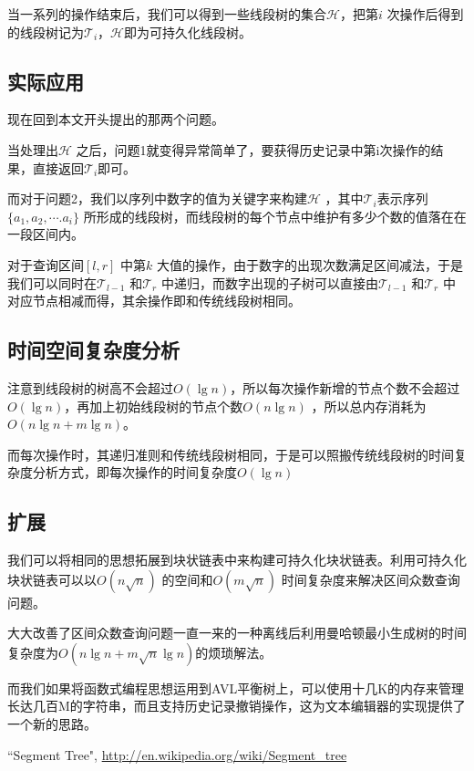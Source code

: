 \documentclass[a4paper]{article}
\renewcommand{\T}{\mathcal{T}}
\begin{document}
当一系列的操作结束后，我们可以得到一些线段树的集合$\mathcal{H}$，把第$i$ 次操作后得到的线段树记为$\T_i$，$\mathcal{H}$即为可持久化线段树。

\subsection{实际应用}
现在回到本文开头提出的那两个问题。

当处理出$\mathcal{H}$ 之后，问题1就变得异常简单了，要获得历史记录中第i次操作的结果，直接返回$\T_i$即可。

而对于问题2，我们以序列中数字的值为关键字来构建$\mathcal{H}$ ，其中$\T_i$表示序列$\{a_1, a_2, \cdots. a_i\}$ 所形成的线段树，而线段树的每个节点中维护有多少个数的值落在在一段区间内。

对于查询区间$[l, r]$ 中第$k$ 大值的操作，由于数字的出现次数满足区间减法，于是我们可以同时在$\T_{l-1}$ 和$\T_r$ 中递归，而数字出现的子树可以直接由$\T_{l-1}$ 和$\T_r$ 中对应节点相减而得，其余操作即和传统线段树相同。

\subsection{时间空间复杂度分析}
注意到线段树的树高不会超过$O(\lg n)$，所以每次操作新增的节点个数不会超过$O(\lg n)$，再加上初始线段树的节点个数$O(n\lg n)$ ，所以总内存消耗为$O(n\lg n + m\lg n)$。

而每次操作时，其递归准则和传统线段树相同，于是可以照搬传统线段树的时间复杂度分析方式，即每次操作的时间复杂度$O(\lg n)$

\subsection{扩展}
我们可以将相同的思想拓展到块状链表中来构建可持久化块状链表。利用可持久化块状链表可以以$O(n\sqrt{n})$ 的空间和$O(m\sqrt{n})$ 时间复杂度来解决区间众数查询问题。

大大改善了区间众数查询问题一直一来的一种离线后利用曼哈顿最小生成树的时间复杂度为$O(n\lg n + m\sqrt{n}\lg n)$的烦琐解法。

而我们如果将函数式编程思想运用到AVL平衡树上，可以使用十几K的内存来管理长达几百M的字符串，而且支持历史记录撤销操作，这为文本编辑器的实现提供了一个新的思路。

\begin{thebibliography}{99}
	 ``Segment Tree", \url{http://en.wikipedia.org/wiki/Segment_tree}
\end{thebibliography}
\end{document}
